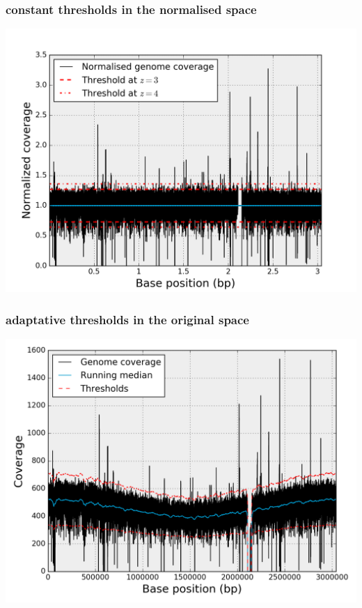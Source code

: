 \documentclass{beamer}
\begin{document}
 \begin{frame}
 \frametitle{constant thresholds in the normalised space}
\includegraphics[height=0.9\textheight, 
    width=1\textwidth]{images/fig2.png}
\end{frame}

 
\begin{frame}
 \frametitle{adaptative thresholds in the original space}
\includegraphics[height=0.9\textheight, 
    width=1\textwidth]{images/fig3.png}
\end{frame}

 
 
\end{document}
